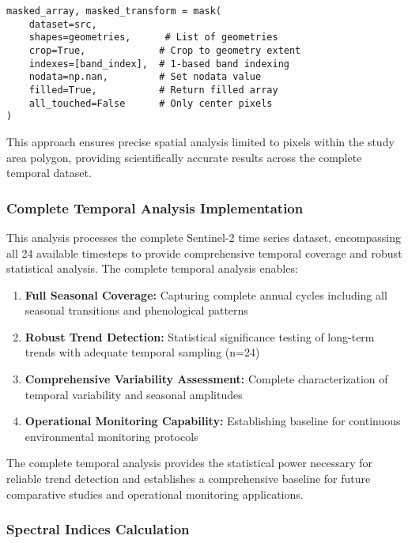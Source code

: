 \documentclass[a4paper,12pt]{article}
\begin{document}
\begin{lstlisting}[caption=Correct rasterio.mask implementation for complete analysis]
masked_array, masked_transform = mask(
    dataset=src,
    shapes=geometries,      # List of geometries
    crop=True,             # Crop to geometry extent  
    indexes=[band_index],  # 1-based band indexing
    nodata=np.nan,         # Set nodata value
    filled=True,           # Return filled array
    all_touched=False      # Only center pixels
)
\end{lstlisting}

This approach ensures precise spatial analysis limited to pixels within the
study area polygon, providing scientifically accurate results across the complete
temporal dataset.

\subsubsection{Complete Temporal Analysis Implementation}

This analysis processes the complete Sentinel-2 time series dataset,
encompassing all 24 available timesteps to provide comprehensive temporal
coverage and robust statistical analysis. The complete temporal analysis
enables:

\begin{enumerate}
    \item \textbf{Full Seasonal Coverage:} Capturing complete annual cycles
          including all seasonal transitions and phenological patterns
    \item \textbf{Robust Trend Detection:} Statistical significance testing
          of long-term trends with adequate temporal sampling (n=24)
    \item \textbf{Comprehensive Variability Assessment:} Complete characterization
          of temporal variability and seasonal amplitudes
    \item \textbf{Operational Monitoring Capability:} Establishing baseline
          for continuous environmental monitoring protocols
\end{enumerate}

The complete temporal analysis provides the statistical power necessary for
reliable trend detection and establishes a comprehensive baseline for future
comparative studies and operational monitoring applications.

\subsubsection{Spectral Indices Calculation}
\end{document}
